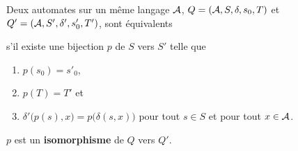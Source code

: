 \medskip

\begin{defin}

Deux automates sur un même langage ${\cal A}$, $Q=({\cal A},S,\delta,s_0,T)$ et $Q'=({\cal A},S',\delta',s'_0,T')$, sont équivalents 

s'il existe une bijection $p$ de $S$ vers $S'$ telle que
\begin{enumerate}
\item $p(s_0)=s'_0$,
\item $p(T)=T'$ et
\item $\delta'\bigl(p(s),x\bigr)=p\bigl(\delta(s,x)\bigr)$ pour tout $s\in S$ et pour tout $x\in {\cal A}$.
\end{enumerate}
$p$ est un {\bf isomorphisme} de $Q$ vers $Q'$.
\end{defin}

